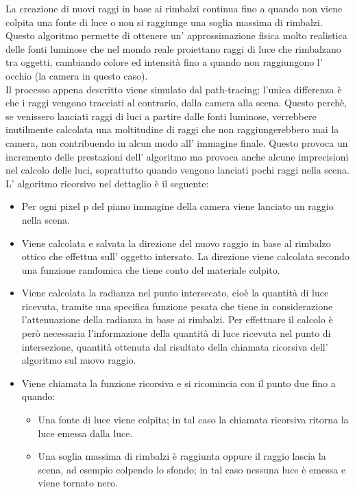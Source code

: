 La creazione di nuovi raggi in base ai rimbalzi continua fino a quando non viene colpita una fonte di luce o non si raggiunge una soglia massima di rimbalzi.
Questo algoritmo permette di ottenere un’ approssimazione fisica molto realistica delle fonti luminose che nel mondo reale  proiettano raggi di luce che rimbalzano tra oggetti, cambiando colore ed intensità fino a quando non raggiungono l’ occhio (la camera in questo caso).
\\
Il processo appena descritto viene simulato dal path-tracing; l’unica differenza è che i raggi vengono tracciati al contrario, dalla camera alla scena. Questo perchè, se venissero lanciati raggi di luci a partire dalle fonti luminose, verrebbere inutilmente calcolata una moltitudine di raggi che non raggiungerebbero mai la camera, non contribuendo in alcun modo all’ immagine finale.
Questo provoca un incremento delle prestazioni dell’ algoritmo ma provoca anche alcune imprecisioni nel calcolo delle luci, soprattutto quando vengono lanciati pochi raggi nella scena.
\\
L’ algoritmo ricorsivo nel dettaglio è il seguente:
\begin{itemize}
\item Per ogni pixel p del piano immagine della camera viene lanciato un raggio nella scena.
\item Viene calcolata e salvata la direzione del nuovo raggio in base al rimbalzo ottico che effettua sull’ oggetto intersato. La direzione viene calcolata secondo una funzione randomica che tiene conto del materiale colpito.
\item Viene calcolata la radianza nel punto intersecato, cioè la quantità di luce ricevuta,  tramite una specifica funzione pesata che tiene in considerazione l’attenuazione della radianza in base ai rimbalzi. Per effettuare il calcolo è però necessaria l’informazione della quantità di luce ricevuta nel punto di intersezione, quantità ottenuta dal risultato della chiamata ricorsiva dell’ algoritmo sul nuovo raggio.
\item Viene chiamata la funzione ricorsiva e si ricomincia con il punto due fino a quando:
\begin{itemize}
\item Una fonte di luce viene colpita; in tal caso la chiamata ricorsiva ritorna la luce emessa dalla luce.
\item Una soglia massima di rimbalzi è raggiunta oppure il raggio lascia la scena, ad esempio colpendo lo sfondo; in tal caso nessuna luce è emessa e viene tornato nero.
\end{itemize}
\end{itemize}
